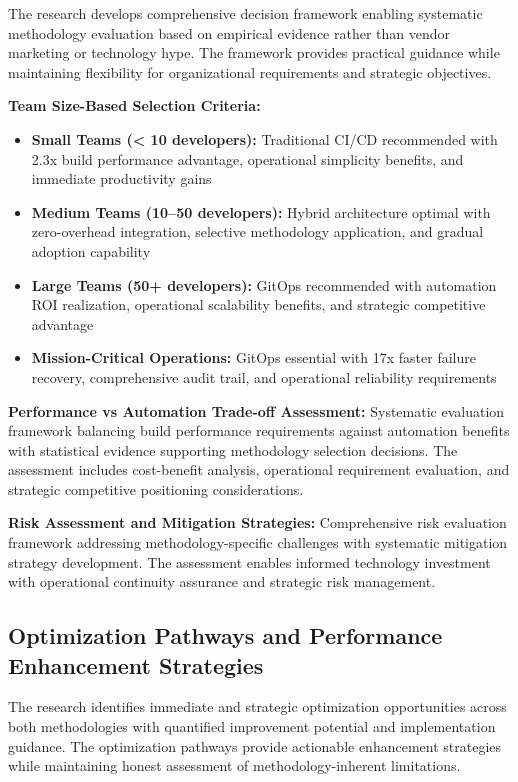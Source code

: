 The research develops comprehensive decision framework enabling systematic methodology evaluation based on empirical evidence rather than vendor marketing or technology hype. The framework provides practical guidance while maintaining flexibility for organizational requirements and strategic objectives.

\textbf{Team Size-Based Selection Criteria:}
\begin{itemize}
\item \textbf{Small Teams (< 10 developers):} Traditional CI/CD recommended with 2.3x build performance advantage, operational simplicity benefits, and immediate productivity gains
\item \textbf{Medium Teams (10--50 developers):} Hybrid architecture optimal with zero-overhead integration, selective methodology application, and gradual adoption capability
\item \textbf{Large Teams (50+ developers):} GitOps recommended with automation ROI realization, operational scalability benefits, and strategic competitive advantage
\item \textbf{Mission-Critical Operations:} GitOps essential with 17x faster failure recovery, comprehensive audit trail, and operational reliability requirements
\end{itemize}

\textbf{Performance vs Automation Trade-off Assessment:}
Systematic evaluation framework balancing build performance requirements against automation benefits with statistical evidence supporting methodology selection decisions. The assessment includes cost-benefit analysis, operational requirement evaluation, and strategic competitive positioning considerations.

\textbf{Risk Assessment and Mitigation Strategies:}
Comprehensive risk evaluation framework addressing methodology-specific challenges with systematic mitigation strategy development. The assessment enables informed technology investment with operational continuity assurance and strategic risk management.

\subsection{Optimization Pathways and Performance Enhancement Strategies}
\label{subsec:optimization_pathways}

The research identifies immediate and strategic optimization opportunities across both methodologies with quantified improvement potential and implementation guidance. The optimization pathways provide actionable enhancement strategies while maintaining honest assessment of methodology-inherent limitations.

